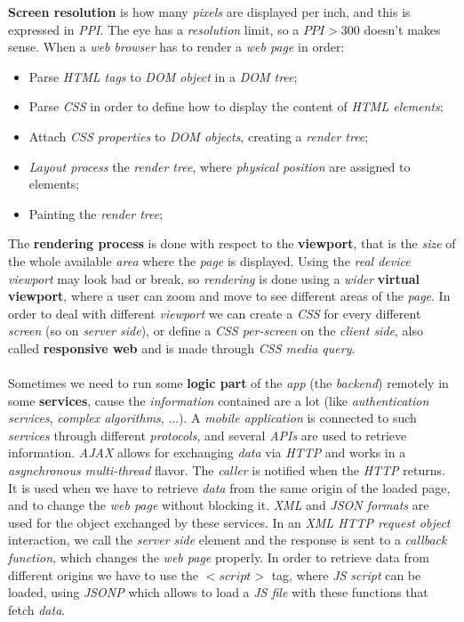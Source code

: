 \documentclass{article}
\begin{document}
\textbf{Screen resolution} is how many \emph{pixels} are displayed per inch, and this is expressed in \emph{PPI}. The eye has a \emph{resolution} limit, so a $PPI > 300$ doesn't makes sense. When a \emph{web browser} has to render a \emph{web page} in order:
\begin{itemize}
\item Parse \emph{HTML tags} to \emph{DOM object} in a \emph{DOM tree};
\item Parse \emph{CSS} in order to define how to display the content of \emph{HTML elements};
\item Attach \emph{CSS properties} to \emph{DOM objects}, creating a \emph{render tree};
\item \emph{Layout process} the \emph{render tree}, where \emph{physical position} are assigned to elements;
\item Painting the \emph{render tree};
\end{itemize}
The \textbf{rendering process} is done with respect to the \textbf{viewport}, that is the \emph{size} of the whole available \emph{area} where the \emph{page} is displayed. Using the \emph{real device viewport} may look bad or break, so \emph{rendering} is done using a \emph{wider} \textbf{virtual viewport}, where a user can zoom and move to see different areas of the \emph{page}. In order to deal with different \emph{viewport} we can create a \emph{CSS} for every different \emph{screen} (so on \emph{server side}), or define a \emph{CSS per-screen} on the \emph{client side}, also called \textbf{responsive web} and is made through \emph{CSS media query}.\\\\
Sometimes we need to run some \textbf{logic part} of the \emph{app} (the \emph{backend}) remotely in some \textbf{services}, cause the \emph{information} contained are a lot (like \emph{authentication services}, \emph{complex algorithms}, ...). A \emph{mobile application} is connected to such \emph{services} through different \emph{protocols}, and several \emph{APIs} are used to retrieve information. \emph{AJAX} allows for exchanging \emph{data} via \emph{HTTP} and works in a \emph{asynchronous multi-thread} flavor. The \emph{caller} is notified when the \emph{HTTP} returns. It is used when we have to retrieve \emph{data} from the same origin of the loaded page, and to change the \emph{web page} without blocking it. \emph{XML} and \emph{JSON formats} are used for the object exchanged by these services. In an \emph{XML HTTP request object} interaction, we call the \emph{server side} element and the response is sent to a \emph{callback function}, which changes the\emph{ web page} properly. In order to retrieve data from different origins we have to use the $<script>$ tag, where\emph{ JS script} can be loaded, using \emph{JSONP} which allows to load a \emph{JS file }with these functions that fetch \emph{data}. 
\end{document}
